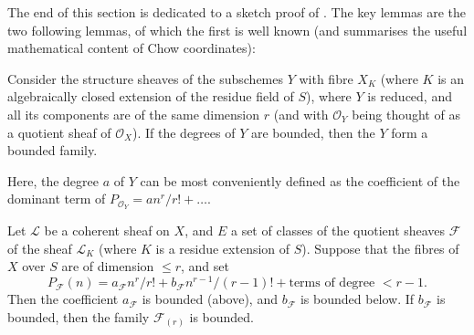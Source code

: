   The end of this section is dedicated to a sketch proof of .
  The key lemmas are the two following lemmas, of which the first is well known (and summarises the useful mathematical content of Chow coordinates):


  \begin{lemma}\label{fga3.iv-2-lemma-2.4}
    Consider the structure sheaves of the subschemes $Y$ with fibre $X_K$ (where $K$ is an algebraically closed extension of the residue field of $S$), where $Y$ is reduced, and all its components are of the same dimension $r$ (and with $\mathcal{O}_Y$ being thought of as a quotient sheaf of $\mathcal{O}_X$).
    If the degrees of $Y$ are bounded, then the $Y$ form a bounded family.
  \end{lemma}

  Here, the degree $a$ of $Y$ can be most conveniently defined as the coefficient of the dominant term of $P_{\mathcal{O}_Y}=an^r/r!+\ldots$.


  \begin{lemma}\label{fga3.iv-2-lemma-2.5}

    Let $\mathcal{L}$ be a coherent sheaf on $X$, and $E$ a set of classes of the quotient sheaves $\mathcal{F}$ of the sheaf $\mathcal{L}_K$ (where $K$ is a residue extension of $S$).
    Suppose that the fibres of $X$ over $S$ are of dimension $\leqslant r$, and set
    \[
      P_\mathcal{F}(n)
      = a_\mathcal{F}n^r/r! + b_\mathcal{F}n^{r-1}/(r-1)! + \text{terms of degree }<r-1.
    \]
    Then the coefficient $a_\mathcal{F}$ is bounded (above), and $b_\mathcal{F}$ is bounded below.
    If $b_\mathcal{F}$ is bounded, then the family $\mathcal{F}_{(r)}$ is bounded.
  \end{lemma}

